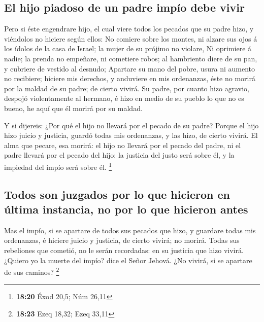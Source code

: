 \hypertarget{el-hijo-piadoso-de-un-padre-impuxedo-debe-vivir}{%
\subsection{El hijo piadoso de un padre impío debe
vivir}\label{el-hijo-piadoso-de-un-padre-impuxedo-debe-vivir}}

 Pero si éste engendrare hijo, el cual viere todos los
pecados que su padre hizo, y viéndolos no hiciere según ellos:
 No comiere sobre los montes, ni alzare sus ojos á los
ídolos de la casa de Israel; la mujer de su prójimo no violare,
 Ni oprimiere á nadie; la prenda no empeñare, ni cometiere
robos; al hambriento diere de su pan, y cubriere de vestido al desnudo;
 Apartare su mano del pobre, usura ni aumento no recibiere;
hiciere mis derechos, y anduviere en mis ordenanzas, éste no morirá por
la maldad de su padre; de cierto vivirá.  Su padre, por
cuanto hizo agravio, despojó violentamente al hermano, é hizo en medio
de su pueblo lo que no es bueno, he aquí que él morirá por su maldad.

 Y si dijereis: ¿Por qué el hijo no llevará por el pecado
de su padre? Porque el hijo hizo juicio y justicia, guardó todas mis
ordenanzas, y las hizo, de cierto vivirá.  El alma que
pecare, esa morirá: el hijo no llevará por el pecado del padre, ni el
padre llevará por el pecado del hijo: la justicia del justo será sobre
él, y la impiedad del impío será sobre él. \footnote{\textbf{18:20} Éxod
  20,5; Núm 26,11}

\hypertarget{todos-son-juzgados-por-lo-que-hicieron-en-uxfaltima-instancia-no-por-lo-que-hicieron-antes}{%
\subsection{Todos son juzgados por lo que hicieron en última instancia,
no por lo que hicieron
antes}\label{todos-son-juzgados-por-lo-que-hicieron-en-uxfaltima-instancia-no-por-lo-que-hicieron-antes}}

 Mas el impío, si se apartare de todos sus pecados que
hizo, y guardare todas mis ordenanzas, é hiciere juicio y justicia, de
cierto vivirá; no morirá.  Todas sus rebeliones que
cometió, no le serán recordadas: en su justicia que hizo vivirá.
 ¿Quiero yo la muerte del impío? dice el Señor Jehová. ¿No
vivirá, si se apartare de sus caminos? \footnote{\textbf{18:23} Ezeq
  18,32; Ezeq 33,11}

